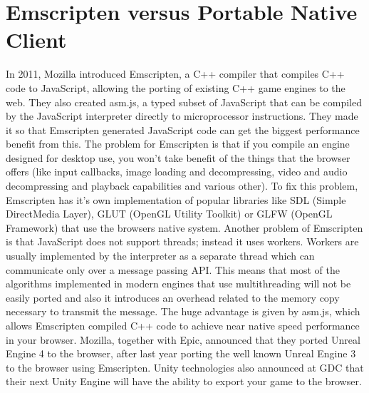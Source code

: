 \section{Emscripten versus Portable Native Client}
\label{sec: Emscripten, PNaCl}

In 2011, Mozilla introduced Emscripten, a C++ compiler that compiles C++ code to JavaScript, allowing the porting of existing C++ game engines to the web. They also created asm.js, a typed subset of JavaScript that can be compiled by the JavaScript interpreter directly to microprocessor instructions. They made it so that Emscripten generated JavaScript code can get the biggest performance benefit from this. The problem for Emscripten is that if you compile an engine designed for desktop use, you won't take benefit of the things that the browser offers (like input callbacks, image loading and decompressing, video and audio decompressing and playback capabilities and various other). To fix this problem, Emscripten has it's own implementation of popular libraries like SDL (Simple DirectMedia Layer), GLUT (OpenGL Utility Toolkit) or GLFW (OpenGL Framework) that use the browsers native system. Another problem of Emscripten is that JavaScript does not support threads; instead it uses workers. Workers are usually implemented by the interpreter as a separate thread which can communicate only over a message passing API. This means that most of the algorithms implemented in modern engines that use multithreading will not be easily ported and also it introduces an overhead related to the memory copy necessary to transmit the message. The huge advantage is given by asm.js, which allows Emscripten compiled C++ code to achieve near native speed performance in your browser. Mozilla, together with Epic, announced that they ported Unreal Engine 4 to the browser, after last year porting the well known Unreal Engine 3 to the browser using Emscripten. Unity technologies also announced at GDC that their next Unity Engine will have the ability to export your game to the browser.


